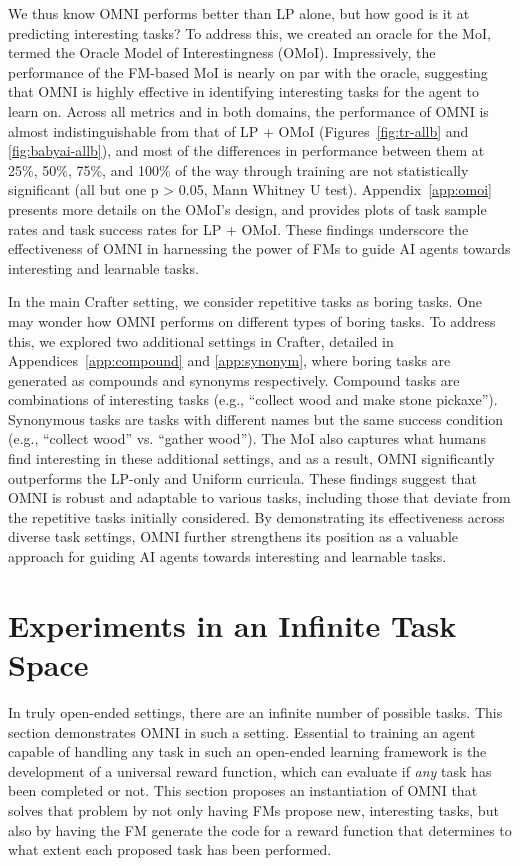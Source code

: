 \documentclass{article} %
\begin{document}
We thus know OMNI performs better than LP alone, but how good is it at predicting interesting tasks? To address this, we created an oracle for the MoI, termed the Oracle Model of Interestingness (OMoI). Impressively, the performance of the FM-based MoI is nearly on par with the oracle, suggesting that OMNI is highly effective in identifying interesting tasks for the agent to learn on. Across all metrics and in both domains, the performance of OMNI is almost indistinguishable from that of LP + OMoI (Figures~\ref{fig:tr-allb} and \ref{fig:babyai-allb}), and most of the differences in performance between them at 25\%, 50\%, 75\%, and 100\% of the way through training are not statistically significant (all but one p > 0.05, Mann Whitney U test). Appendix~\ref{app:omoi} presents more details on the OMoI's design, and provides plots of task sample rates and task success rates for LP + OMoI. These findings underscore the effectiveness of OMNI in harnessing the power of FMs to guide AI agents towards interesting and learnable tasks.

In the main Crafter setting, we consider repetitive tasks as boring tasks. One may wonder how OMNI performs on different types of boring tasks. To address this, we explored two additional settings in Crafter, detailed in Appendices~\ref{app:compound} and \ref{app:synonym}, where boring tasks are generated as compounds and synonyms respectively. Compound tasks are combinations of interesting tasks (e.g., ``collect wood and make stone pickaxe''). Synonymous tasks are tasks with different names but the same success condition (e.g., ``collect wood'' vs. ``gather wood''). The MoI also captures what humans find interesting in these additional settings, and as a result, OMNI significantly outperforms the LP-only and Uniform curricula. These findings suggest that OMNI is robust and adaptable to various tasks, including those that deviate from the repetitive tasks initially considered. By demonstrating its effectiveness across diverse task settings, OMNI further strengthens its position as a valuable approach for guiding AI agents towards interesting and learnable tasks.

\section{Experiments in an Infinite Task Space}
\label{sec:thor-whole}
In truly open-ended settings, there are an infinite number of possible tasks. This section demonstrates OMNI in such a setting. Essential to training an agent capable of handling any task in such an open-ended learning framework is the development of a universal reward function, which can evaluate if \emph{any} task has been completed or not. This section proposes an instantiation of OMNI that solves that problem by not only having FMs propose new, interesting tasks, but also by having the FM generate the code for a reward function that determines to what extent each proposed task has been performed. 
\end{document}
